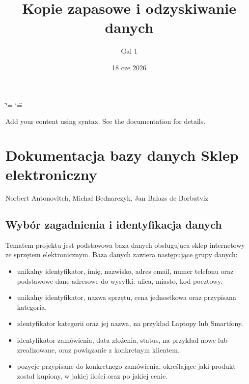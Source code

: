 \documentclass[letterpaper,10pt,polish]{sphinxmanual}
\title{Kopie zapasowe i odzyskiwanie danych}
\date{18 cze 2026}
\author{Gal 1}
\begin{document}
\ifdefined\shorthandoff
  \ifnum\catcode`\=\string=\active\shorthandoff{=}\fi
  \ifnum\catcode`\"=\active{}\fi
\fi

\pagestyle{empty}
\sphinxmaketitle
\pagestyle{plain}
\sphinxtableofcontents
\pagestyle{normal}
\label{\detokenize{index::doc}}


\sphinxAtStartPar
Add your content using  syntax. See the
documentation for details.

\sphinxstepscope

\sphinxstepscope


\chapter{Dokumentacja bazy danych \textendash{} Sklep elektroniczny}
\label{\detokenize{rozdzial_3/index:dokumentacja-bazy-danych-sklep-elektroniczny}}\label{\detokenize{rozdzial_3/index::doc}}
\sphinxAtStartPar
{} Norbert Antonovitch, Michał Bednarczyk, Jan Balazs de Borbatviz


\section{Wybór zagadnienia i identyfikacja danych}
\label{\detokenize{rozdzial_3/index:wybor-zagadnienia-i-identyfikacja-danych}}
\sphinxAtStartPar
Tematem projektu jest podstawowa baza danych obsługująca sklep internetowy ze sprzętem elektronicznym.
Baza danych zawiera następujące grupy danych:
\begin{itemize}
\item {} 
\sphinxAtStartPar
{} unikalny identyfikator, imię, nazwisko, adres e\sphinxhyphen{}mail, numer telefonu oraz podstawowe dane adresowe do wysyłki: ulica, miasto, kod pocztowy.

\item {} 
\sphinxAtStartPar
{} unikalny identyfikator, nazwa sprzętu, cena jednostkowa oraz przypisana kategoria.

\item {} 
\sphinxAtStartPar
{} identyfikator kategorii oraz jej nazwa, na przykład Laptopy lub Smartfony.

\item {} 
\sphinxAtStartPar
{} identyfikator zamówienia, data złożenia, status, na przykład nowe lub zrealizowane, oraz powiązanie z konkretnym klientem.

\item {} 
\sphinxAtStartPar
{} pozycje przypisane do konkretnego zamówienia, określające jaki produkt został kupiony, w jakiej ilości oraz po jakiej cenie.

\end{itemize}
\end{document}
